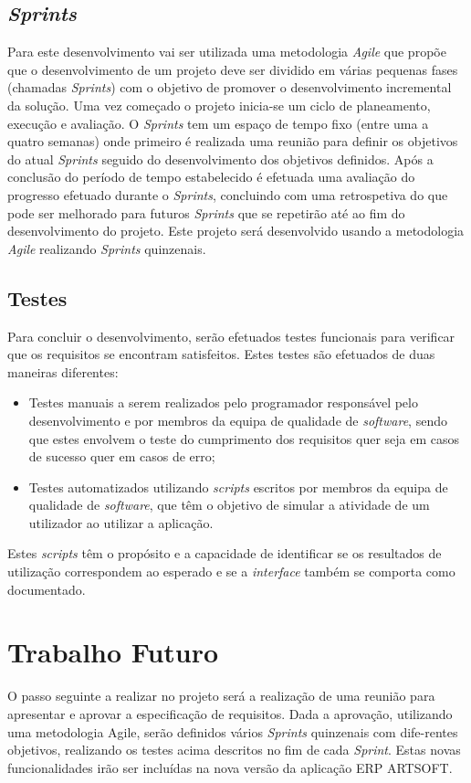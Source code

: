 \documentclass[sigplan]{acmart}
\begin{document}
\subsection{\textit{Sprints}}

Para este desenvolvimento vai ser utilizada uma metodologia \textit{Agile} que propõe que o desenvolvimento de um projeto deve ser dividido em várias pequenas fases (chamadas \textit{Sprints}) com o objetivo de promover o desenvolvimento incremental da solução. Uma vez começado o projeto inicia-se um ciclo de planeamento, execução e avaliação. O \textit{Sprints} tem um espaço de tempo fixo (entre uma a quatro semanas) onde primeiro é realizada uma reunião para definir os objetivos do atual \textit{Sprints} seguido do desenvolvimento dos objetivos definidos. Após a conclusão do período de tempo estabelecido é efetuada uma avaliação do progresso efetuado durante o \textit{Sprints}, concluindo com uma retrospetiva do que pode ser melhorado para futuros \textit{Sprints} que se repetirão até ao fim do desenvolvimento do projeto. Este projeto será desenvolvido usando a metodologia \textit{Agile} realizando \textit{Sprints} quinzenais.

\subsection{Testes}

Para concluir o desenvolvimento, serão efetuados testes funcionais para verificar que os requisitos se encontram satisfeitos. Estes testes são efetuados de duas maneiras diferentes:
\begin{itemize}
  \item Testes manuais a serem realizados pelo programador responsável pelo desenvolvimento e por membros da equipa de qualidade de \textit{software}, sendo que estes envolvem o teste do cumprimento dos requisitos quer seja em casos de sucesso quer em casos de erro;
  \item Testes automatizados utilizando \textit{scripts} escritos por membros da equipa de qualidade de \textit{software}, que têm o objetivo de simular a atividade de um utilizador ao utilizar a aplicação.
\end{itemize}
Estes \textit{scripts} têm o propósito e a capacidade de identificar se os resultados de utilização correspondem ao esperado e se a \textit{interface} também se comporta como documentado.

\section{Trabalho Futuro} \label{sec:forthcomingwork}

O passo seguinte a realizar no projeto será a realização de uma reunião para apresentar e aprovar a especificação de requisitos. Dada a aprovação, utilizando uma metodologia Agile, serão definidos vários \textit{Sprints} quinzenais com dife-rentes objetivos, realizando os testes acima descritos no fim de cada \textit{Sprint}. Estas novas funcionalidades irão ser incluídas na nova versão da aplicação ERP ARTSOFT.



\end{document}
